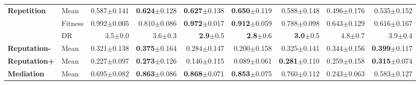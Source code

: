 \begin{table}[t]
{\begin{tabular}{ll||r|rrrrrr}
\midrule
\multirow{3}{*}{\textbf{Repetition}} & Mean & \cellcolor[HTML]{FDF6E8} 0.587{\scriptsize\color{black!75}$\pm$0.141} & \textbf{0.624}{\scriptsize\color{black!75}$\pm$0.128} & \textbf{0.627}{\scriptsize\color{black!75}$\pm$0.138} & \textbf{0.650}{\scriptsize\color{black!75}$\pm$0.119} & 0.588{\scriptsize\color{black!75}$\pm$0.148} & \textcolor{black!75}{0.496}{\scriptsize\color{black!75}$\pm$0.176} & \textcolor{black!75}{0.535}{\scriptsize\color{black!75}$\pm$0.152} \\
 & Fitness & \cellcolor[HTML]{F3D082} 0.992{\scriptsize\color{black!75}$\pm$0.005} & 0.810{\scriptsize\color{black!75}$\pm$0.086} & \textbf{0.972}{\scriptsize\color{black!75}$\pm$0.017} & \textbf{0.912}{\scriptsize\color{black!75}$\pm$0.059} & 0.788{\scriptsize\color{black!75}$\pm$0.098} & \textcolor{black!75}{0.643}{\scriptsize\color{black!75}$\pm$0.129} & \textcolor{black!75}{0.616}{\scriptsize\color{black!75}$\pm$0.167} \\
 & DR & 3.5{\scriptsize\color{black!75}$\pm$0.0} & 3.6{\scriptsize\color{black!75}$\pm$0.3} & \textbf{2.9}{\scriptsize\color{black!75}$\pm$0.5} & \textbf{2.8}{\scriptsize\color{black!75}$\pm$0.6} & \textbf{3.0}{\scriptsize\color{black!75}$\pm$0.5} & \textcolor{black!75}{4.8}{\scriptsize\color{black!75}$\pm$0.7} & \textcolor{black!75}{3.9}{\scriptsize\color{black!75}$\pm$0.4} \\
\midrule
\textbf{Reputation-} & Mean & \cellcolor[HTML]{D1E6F1} 0.321{\scriptsize\color{black!75}$\pm$0.138} & \textbf{0.375}{\scriptsize\color{black!75}$\pm$0.164} & \textcolor{black!75}{0.284}{\scriptsize\color{black!75}$\pm$0.147} & \textcolor{black!75}{0.200}{\scriptsize\color{black!75}$\pm$0.158} & 0.325{\scriptsize\color{black!75}$\pm$0.141} & 0.344{\scriptsize\color{black!75}$\pm$0.156} & \textbf{0.399}{\scriptsize\color{black!75}$\pm$0.117} \\
\midrule
\textbf{Reputation+} & Mean & \cellcolor[HTML]{BAD9EA} 0.227{\scriptsize\color{black!75}$\pm$0.097} & \textbf{0.273}{\scriptsize\color{black!75}$\pm$0.126} & \textcolor{black!75}{0.146}{\scriptsize\color{black!75}$\pm$0.115} & \textcolor{black!75}{0.089}{\scriptsize\color{black!75}$\pm$0.061} & \textbf{0.281}{\scriptsize\color{black!75}$\pm$0.110} & 0.259{\scriptsize\color{black!75}$\pm$0.158} & \textbf{0.315}{\scriptsize\color{black!75}$\pm$0.074} \\
\midrule
\multirow{3}{*}{\textbf{Mediation}} & Mean & \cellcolor[HTML]{FAEDCF} 0.695{\scriptsize\color{black!75}$\pm$0.082} & \textbf{0.863}{\scriptsize\color{black!75}$\pm$0.086} & \textbf{0.868}{\scriptsize\color{black!75}$\pm$0.071} & \textbf{0.853}{\scriptsize\color{black!75}$\pm$0.075} & 0.760{\scriptsize\color{black!75}$\pm$0.112} & \textcolor{black!75}{0.243}{\scriptsize\color{black!75}$\pm$0.063} & \textcolor{black!75}{0.583}{\scriptsize\color{black!75}$\pm$0.127} \\

\end{tabular}}
\end{table}

